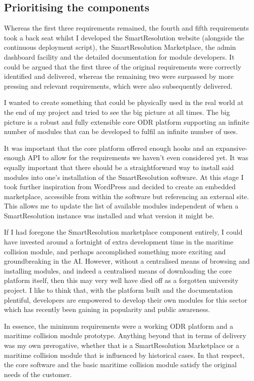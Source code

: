 \subsection{Prioritising the components}

Whereas the first three requirements remained, the fourth and fifth requirements took a back seat whilst I developed the SmartResolution website (alongside the continuous deployment script), the SmartResolution Marketplace, the admin dashboard facility and the detailed documentation for module developers. It could be argued that the first three of the original requirements were correctly identified and delivered, whereas the remaining two were surpassed by more pressing and relevant requirements, which were also subsequently delivered.

I wanted to create something that could be physically used in the real world at the end of my project and tried to see the big picture at all times. The big picture is a robust and fully extensible core ODR platform supporting an infinite number of modules that can be developed to fulfil an infinite number of uses.

It was important that the core platform offered enough hooks and an expansive-enough API to allow for the requirements we haven't even considered yet. It was equally important that there should be a straightforward way to install said modules into one's installation of the SmartResolution software. At this stage I took further inspiration from WordPress and decided to create an embedded marketplace, accessible from within the software but referencing an external site. This allows me to update the list of available modules independent of when a SmartResolution instance was installed and what version it might be.

If I had foregone the SmartResolution marketplace component entirely, I could have invested around a fortnight of extra development time in the maritime collision module, and perhaps accomplished something more exciting and groundbreaking in the AI. However, without a centralised means of browsing and installing modules, and indeed a centralised means of downloading the core platform itself, then this may very well have died off as a forgotten university project. I like to think that, with the platform built and the documentation plentiful, developers are empowered to develop their own modules for this sector which has recently been gaining in popularity and public awareness.

In essence, the minimum requirements were a working ODR platform and a maritime collision module prototype. Anything beyond that in terms of delivery was my own prerogative, whether that is a SmartResolution Marketplace or a maritime collision module that is influenced by historical cases. In that respect, the core software and the basic maritime collision module satisfy the original needs of the customer.

